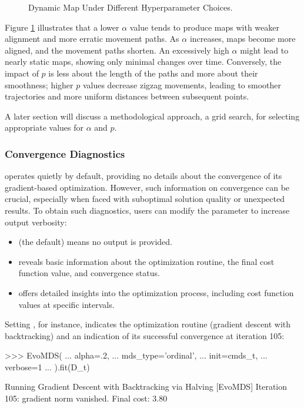 \documentclass[article]{jss}
\begin{document}
\begin{figure}[hbt!]
  \centering
  \caption{\label{fig:hyperparameters} Dynamic Map Under Different Hyperparameter Choices.}
\end{figure}
  
Figure \ref{fig:hyperparameters} illustrates that a lower $\alpha$ value tends to produce maps with weaker alignment 
and more erratic movement paths. As $\alpha$ increases, maps become more aligned, and the movement paths shorten. 
An excessively high $\alpha$ might lead to nearly static maps, showing only minimal changes over time. 
Conversely, the impact of $p$ is less about the length of the paths and more about their smoothness; higher $p$ values 
decrease zigzag movements, leading to smoother trajectories and more uniform distances between subsequent points.

A later section will discuss a methodological approach, a grid search, for selecting appropriate 
values for $\alpha$ and $p$.

\subsubsection{Convergence Diagnostics}

 operates quietly by default, providing no details about the convergence
of its gradient-based optimization. However, such information on convergence can be crucial, 
especially when faced with suboptimal solution quality or unexpected results. 
To obtain such diagnostics, users can modify the  parameter to increase output verbosity: 
\begin{itemize}
  \item {} (the default) means no output is provided.
  \item {} reveals basic information about the optimization routine, the final cost function value, and %
  convergence status.
  \item {} offers detailed insights into the optimization process, including cost function values at %
  specific intervals.  
\end{itemize}

Setting , for instance, indicates the optimization routine (gradient descent with backtracking)
and an indication of its successful convergence at iteration 105:

\begin{CodeChunk}
\begin{CodeInput}
>>> EvoMDS(
...   alpha=.2,
...   mds_type='ordinal',
...   init=cmds_t,
...   verbose=1
... ).fit(D_t)    
\end{CodeInput}
\begin{CodeOutput}
[EvoMDS] Running Gradient Descent with Backtracking via Halving
[EvoMDS] Iteration 105: gradient norm vanished. Final cost: 3.80
\end{CodeOutput}
\end{CodeChunk}
\end{document}
